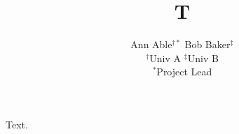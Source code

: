 \documentclass{article}
\title{T}
\author{Ann Able$^{\dagger *}$ \quad Bob Baker$^{\ddagger}$ \\ $^\dagger$Univ A \quad $^\ddagger$Univ B \\ $^*$Project Lead}
\begin{document}
\maketitle
Text.
\end{document}
